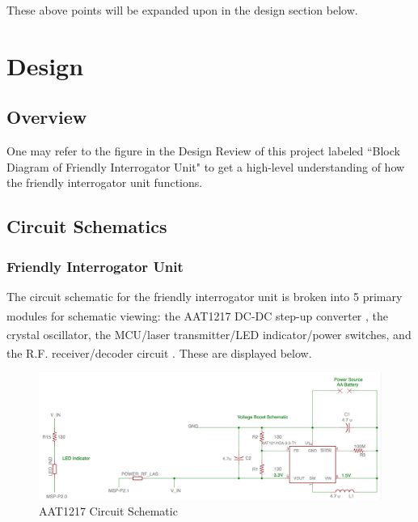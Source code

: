 \documentclass[letterpaper,10pt]{article}
\begin{document}
\begin{spacing}{1.15}
These above points will be expanded upon in the design section below. 

\section{Design}

\subsection{Overview} \label{section-friendly-interrogator-design}
One may refer to the figure in the Design Review of this project labeled ``Block Diagram of Friendly Interrogator Unit" to get a high-level understanding of how the friendly interrogator unit functions. 

\subsection{Circuit Schematics} \label{section-circuit-schematics}

\subsubsection{Friendly Interrogator Unit}
The circuit schematic for the friendly interrogator unit is broken into 5 primary modules for schematic viewing: the AAT1217 DC-DC step-up converter \textsuperscript{\cite{AAT1217}}, the crystal oscillator\textsuperscript{\cite{Crystal}}, the MCU\textsuperscript{\cite{MSP430F2274}}/laser transmitter/LED indicator/power switches, and the R.F. receiver/decoder circuit \textsuperscript{\cite{Linx-Receiver}}. These are displayed below.
\begin{figure} [H]
	\centering
	\includegraphics[scale=0.35]{converter-schematic.png}
	\caption{AAT1217 Circuit Schematic\label{fig:voltage-converter-schematic}}
\end{figure}


\end{spacing}
\end{document}
